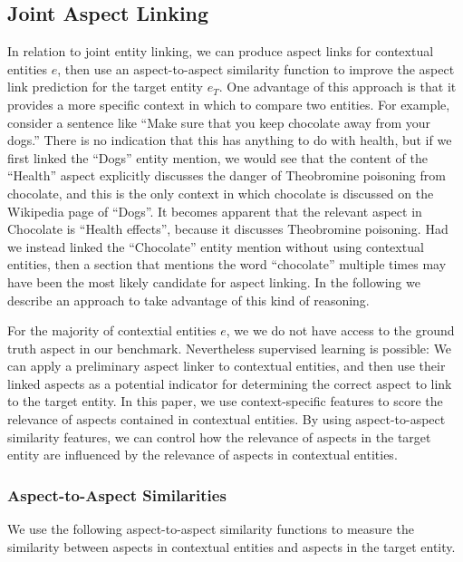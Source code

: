  \subsection{Joint Aspect Linking}\label{jordan-co-entity}
In relation to joint entity linking, we can produce aspect links for contextual entities $e$, then use an aspect-to-aspect similarity function to improve the aspect link prediction for the target entity $e_T$. One advantage of this approach is that it provides a more specific context in which to compare two entities. For example, consider a sentence like ``Make sure that you keep chocolate away from your dogs.'' There is no indication that this has anything to do with health, but if we first linked the ``Dogs'' entity mention, we would see that the content of the ``Health'' aspect explicitly discusses the danger of Theobromine poisoning from chocolate, and this is the only context in which chocolate is discussed on the Wikipedia page of  ``Dogs''. It becomes apparent that the relevant aspect in Chocolate is ``Health effects'', because it discusses Theobromine poisoning. Had we instead linked the ``Chocolate'' entity mention without using contextual entities, then a section that mentions the word ``chocolate'' multiple times may have been the most likely candidate for aspect linking. In the following we describe an approach to take advantage of this kind of reasoning.



For the majority of contextial entities $e$, we we do not have access to the ground truth aspect in our benchmark. Nevertheless supervised learning is possible: We can apply a preliminary aspect linker to contextual entities, and then use their linked aspects as a potential indicator for determining the correct aspect to link to the target entity.
In this paper, we use context-specific features to score the relevance of aspects contained in contextual entities.
By using aspect-to-aspect similarity features, we can control how the relevance of aspects in the target entity are influenced by the relevance of aspects in contextual entities. 

\subsubsection{Aspect-to-Aspect Similarities}
We use the following aspect-to-aspect similarity functions to measure the similarity between aspects in contextual entities and aspects in the target entity.

